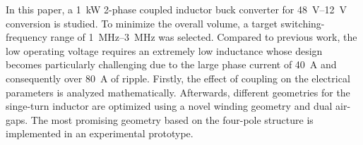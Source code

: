 \documentclass{IPEC2026}
\begin{document}
In this paper, a \qty{1}{\kW} 2-phase coupled inductor buck converter for \qtyrange{48}{12}{\V} conversion is studied. To minimize the overall volume, a target switching-frequency range of \qtyrange{1}{3}{\MHz} was selected. Compared to previous work, the low operating voltage requires an extremely low inductance whose design becomes particularly challenging due to the large phase current of \qty{40}{\A} and consequently over \qty{80}{\A} of ripple. Firstly, the effect of coupling on the electrical parameters is analyzed mathematically. Afterwards, different geometries for the singe-turn inductor are optimized using a novel winding geometry and dual air-gaps. The most promising geometry based on the four-pole structure is implemented in an experimental prototype. %






\end{document}

